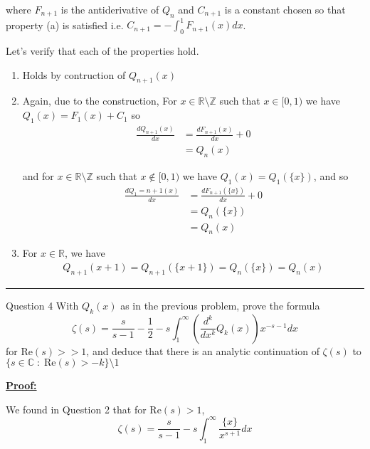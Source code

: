 \documentclass{article}
\newcommand{\R}{\mathbb{R}}
\newcommand{\C}{\mathbb{C}}
\begin{document}
where $F_{n+1}$ is the antiderivative of $Q_{n}$ and $C_{n+1}$ is a constant chosen so that property (a) is satisfied i.e. $C_{n+1} = -\int_{0}^{1} F_{n+1}(x) dx$.

\vskip 0.5cm
Let's verify that each of the properties hold.

\begin{enumerate}[label=(\alph*)]
  \item Holds by contruction of $Q_{n+1}(x)$
  
  \vskip 0.5cm
  \item Again, due to the construction,
  For $x \in \R \setminus \mathbb{Z}$ such that $x \in [0, 1)$ we have $Q_1(x) = F_1(x) + C_1$ so 
  \begin{align*}
    \frac{dQ_{n+1}(x)}{dx} &= \frac{dF_{n+1}(x)}{dx} + 0 \\
    &= Q_{n}(x)
  \end{align*}

  and for $x \in \R \setminus \mathbb{Z}$ such that $x \not\in [0, 1)$ we have $Q_1(x) = Q_1(\{x\})$, and so 
  \begin{align*}
    \frac{dQ_1={n+1}(x)}{dx} &= \frac{dF_{n+1}(\{x\})}{dx} + 0 \\
    &= Q_{n}(\{x\}) \\
    &= Q_n(x)
  \end{align*}

  \vskip 0.5cm
  \item For $x \in \R$, we have 
  \begin{align*}
    Q_{n+1}(x+1) = Q_{n+1}(\{x + 1\}) = Q_{n}(\{x\}) = Q_{n}(x)
  \end{align*}
\end{enumerate}

\vskip 0.5cm
\hrule 
\vskip 0.5cm


\begin{mathdefinitionbox}{Question 4}
\vskip 0.5cm
With $Q_k(x)$ as in the previous problem, prove the formula 
\[ \zeta(s) = \frac{s}{s-1} - \frac{1}{2} - s \int_{1}^{\infty} \left( \frac{d^k}{dx^k} Q_k(x) \right) x^{-s-1} dx \]
for Re$(s) >> 1$, and deduce that there is an analytic continuation of $\zeta(s)$ to $\{s \in \C \;:\; \text{Re}(s) > -k \} \setminus {1}$
\end{mathdefinitionbox}

\vskip 0.5cm
\underline{\textbf{Proof:}}

We found in Question 2 that for Re$(s) > 1$,
\[ \zeta(s) = \frac{s}{s-1} - s\int_1^{\infty} \frac{\{x\}}{x^{s+1}} dx \]
\end{document}
